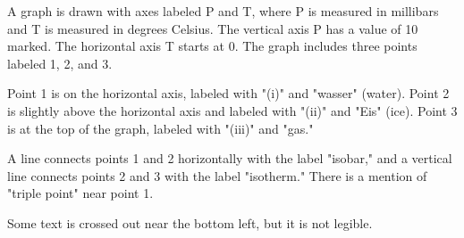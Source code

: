 A graph is drawn with axes labeled P and T, where P is measured in millibars and T is measured in degrees Celsius. The vertical axis P has a value of 10 marked. The horizontal axis T starts at 0. The graph includes three points labeled 1, 2, and 3. 

Point 1 is on the horizontal axis, labeled with "(i)" and "wasser" (water). Point 2 is slightly above the horizontal axis and labeled with "(ii)" and "Eis" (ice). Point 3 is at the top of the graph, labeled with "(iii)" and "gas." 

A line connects points 1 and 2 horizontally with the label "isobar," and a vertical line connects points 2 and 3 with the label "isotherm." There is a mention of "triple point" near point 1. 

Some text is crossed out near the bottom left, but it is not legible.